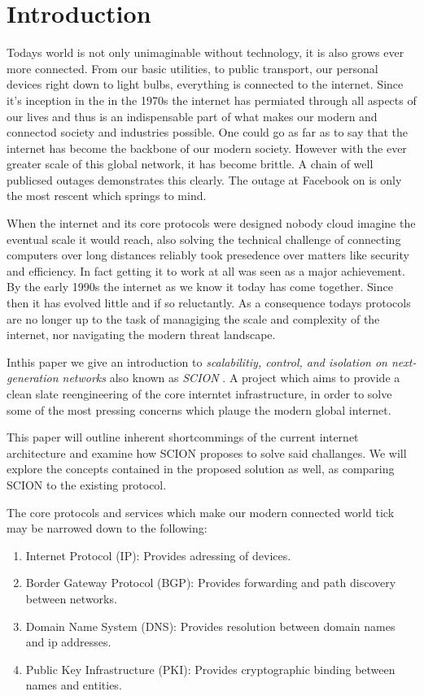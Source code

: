 \documentclass[../eva1_scion.tex]{subfiles}
\begin{document}
\chapter{Introduction}\label{ch:introduction}
\setcounter{page}{1}
Todays world is not only unimaginable without technology, it is also grows ever more connected. From our basic utilities, to public transport, our personal devices right down to light bulbs, everything is connected to the internet. Since it's inception in the in the 1970s the internet has permiated through all aspects of our lives and thus is an indispensable part of what makes our modern and connectod society and industries possible. One could go as far as to say that the internet has become the backbone of our modern society. However with the ever greater scale of this global network, it has become brittle. A chain of well publicsed outages demonstrates this clearly. The outage at Facebook on  is only the most rescent which springs to mind.

When the internet and its core protocols were designed nobody cloud imagine the eventual scale it would reach, also solving the technical challenge of connecting computers over long distances reliably took presedence over matters like security and efficiency. In fact getting it to work at all was seen as a major achievement. By the early 1990s the internet as we know it today has come together. Since then it has evolved little and if so reluctantly. As a consequence todays protocols are no longer up to the task of managiging the scale and complexity of the internet, nor navigating the modern threat landscape.

Inthis paper we give an introduction to \textit{scalabilitiy, control, and isolation on next-generation networks} also known as \textit{ SCION }. A project which aims to provide a clean slate reengineering of the core interntet infrastructure, in order to solve some of the most pressing concerns which plauge the modern global internet.

This paper will outline inherent shortcommings of the current  internet architecture and examine how SCION proposes to solve said challanges. We will explore the concepts contained in the proposed solution as well, as comparing SCION to the existing protocol.

The core protocols and services which make our modern connected world tick may be narrowed down to the following:

\begin{enumerate}
    \item Internet Protocol (IP): Provides adressing of devices.
    \item Border Gateway Protocol (BGP): Provides forwarding and path discovery between networks.
    \item Domain Name System (DNS): Provides resolution between domain names and ip addresses.
    \item Public Key Infrastructure (PKI): Provides cryptographic binding between names and entities.
\end{enumerate}
\end{document}
